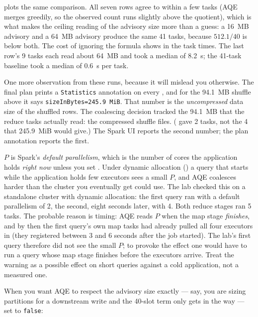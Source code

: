  plots the same comparison. All seven rows agree to within a few tasks (AQE merges greedily, so the observed
count runs slightly above the quotient), which is what makes the ceiling reading
of the advisory size more than a guess: a 16~MB advisory and a 64~MB advisory
produce the same 41 tasks, because $512.1 / 40$ is below both. The cost of
ignoring the formula shows in the task times. The last row's 9 tasks each read
about 64~MB and took a median of 8.2~s; the 41-task baseline took a median of
0.6~s per task.

One more observation from these runs, because it will mislead you otherwise. The
final plan prints a \texttt{Statistics} annotation on every
, and for the 94.1~MB shuffle above it says
\texttt{sizeInBytes=245.9 MiB}. That number is the \emph{uncompressed} data size
of the shuffled rows. The coalescing decision tracked the 94.1~MB that the reduce
tasks actually read: the compressed shuffle files. (
gave 2 tasks, not the 4 that 245.9~MiB would give.) The Spark UI reports the
second number; the plan annotation reports the first.

\begin{warning}
$P$ is Spark's \emph{default parallelism}, which is the number of cores the
application holds \emph{right now} unless you set
. Under dynamic allocation
() a query that starts while the application holds few
executors sees a small $P$, and AQE coalesces harder than the cluster you
eventually get could use. The lab checked this on a standalone cluster with
dynamic allocation: the first query ran with a default parallelism of 2, the second,
eight seconds later, with 4. Both reduce stages ran 5 tasks. The
probable reason is timing: AQE reads $P$ when the map stage \emph{finishes}, and by
then the first query's own map tasks had already pulled all four executors in
(they registered between 3 and 6 seconds after the job started). The lab's first
query therefore did not see the small $P$; to provoke the effect one would have to
run a query whose map stage finishes before the executors arrive. Treat the warning
as a possible effect on short queries against a cold application, not a measured one.
\end{warning}

When you want AQE to respect the advisory size exactly --- say, you are sizing
partitions for a downstream write and the 40-slot term only gets in the way ---
set  to \texttt{false}:

